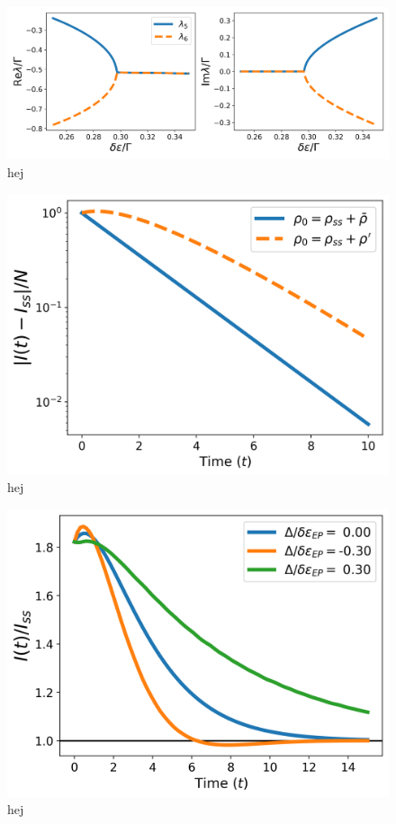 \documentclass[../main.tex]{subfiles}
\begin{document}
\begin{figure}[H]
    \centering
    \includegraphics[width=0.9\linewidth]{figures/tuning.png}
    \caption{hej}
    \label{fig:tuning}
\end{figure}

\begin{figure}[H]
    \centering
    \includegraphics[width=0.7\linewidth]{figures/current_diff_rho_0.png}
    \caption{hej}
    \label{fig:diffrho0}
\end{figure}

\begin{figure}[H]
    \centering
    \includegraphics[width=0.7\linewidth]{figures/curr_diff_de.png}
    \caption{hej}
    \label{fig:diffde}
\end{figure}
\end{document}
